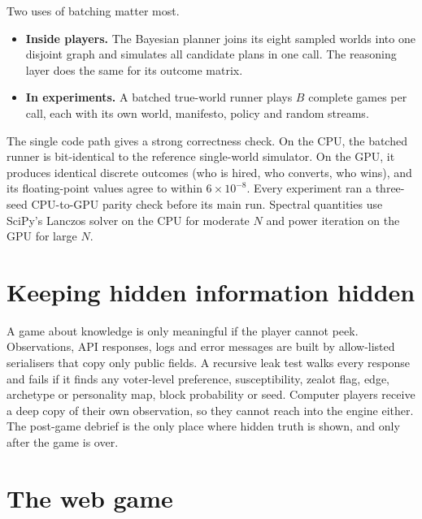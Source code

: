 \documentclass[11pt,a4paper,oneside]{report}
\begin{document}
Two uses of batching matter most.
\begin{itemize}
  \item \textbf{Inside players.} The Bayesian planner joins its eight sampled worlds into one disjoint graph
        and simulates all candidate plans in one call. The reasoning layer does the same for its outcome
        matrix.
  \item \textbf{In experiments.} A batched true-world runner plays $B$ complete games per call, each with
        its own world, manifesto, policy and random streams.
\end{itemize}
The single code path gives a strong correctness check. On the CPU, the batched runner is bit-identical to
the reference single-world simulator. On the GPU, it produces identical discrete outcomes (who is hired,
who converts, who wins), and its floating-point values agree to within $6\times10^{-8}$. Every experiment
ran a three-seed CPU-to-GPU parity check before its main run. Spectral quantities use SciPy's Lanczos
solver on the CPU for moderate $N$ and power iteration on the GPU for large $N$.

\section{Keeping hidden information hidden}

A game about knowledge is only meaningful if the player cannot peek. Observations, API responses, logs and
error messages are built by allow-listed serialisers that copy only public fields. A recursive leak test
walks every response and fails if it finds any voter-level preference, susceptibility, zealot flag, edge,
archetype or personality map, block probability or seed. Computer players receive a deep copy of their own
observation, so they cannot reach into the engine either. The post-game debrief is the only place where
hidden truth is shown, and only after the game is over.

\section{The web game}
\end{document}
